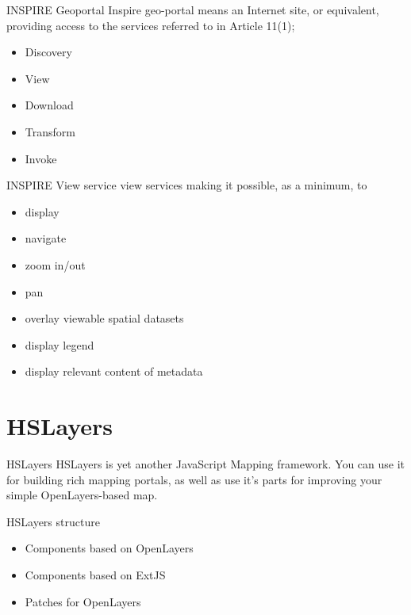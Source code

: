 \documentclass[xcolor=dvipsnames]{beamer}
\begin{document}
\begin{frame}
\begin{block}{INSPIRE Geoportal}
Inspire geo-portal means an Internet site, or equivalent,
providing access to the services referred to in Article 11(1);
\end{block}
\begin{itemize}
    \item Discovery
    \item \alert{View}
    \item Download
    \item Transform
    \item Invoke
\end{itemize}
\end{frame}

\begin{frame}
\begin{block}{INSPIRE View service}
view services making it possible, as a minimum, to
\end{block}
\begin{itemize}
    \item display
    \item navigate
    \item zoom in/out
    \item pan
    \item overlay viewable spatial datasets
    \item display legend
    \item display relevant content of metadata
\end{itemize}
\end{frame}

\section{HSLayers}
\begin{frame}
\begin{block}{HSLayers}
HSLayers is yet another JavaScript Mapping framework. You can use it for building rich mapping portals, as well as use it’s parts for improving your simple OpenLayers-based map.
\end{block}
\end{frame}

\begin{frame}{HSLayers structure}
\begin{itemize}
    \item Components based on OpenLayers
    \item Components based on ExtJS
    \item Patches for OpenLayers
\end{itemize}
\end{frame}
\end{document}
